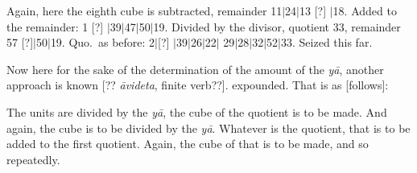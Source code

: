 \documentclass[11pt,a5paper]{book}
\def\ya{\textit{y\=a}}
\def\danda{$|$}
\begin{document}
Again, here the eighth cube is subtracted, remainder 11\danda 24\danda 13 [?] \danda 18. Added to the
remainder: 1 [?] \danda 39\danda 47\danda 50\danda 19. Divided by the divisor, quotient 33, 
remainder 57 [?]\danda 50\danda 19. Quo.\ as before: 2\danda [?] \danda 39\danda 26\danda 22\danda
29\danda 28\danda 32\danda 52\danda 33. Seized this far. 

Now here for the sake of the determination of the amount of the \ya, another approach is known 
[?? \textit{\=avideta}, finite verb??]. 
expounded. That is as [follows]: 

The units are divided by the \ya, the cube of the quotient is to be made. And again, the cube is
to be divided by the \ya. Whatever is the quotient, that is to be added to the first quotient. Again,
the cube of that is to be made, and so repeatedly.  
\end{document}

